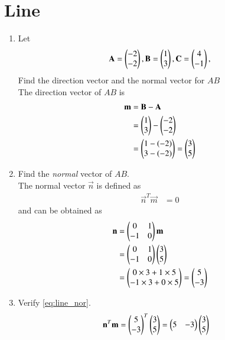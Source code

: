 \documentclass[journal,12pt,twocolumn]{IEEEtran}
\renewcommand\thesection{\arabic{section}}
\begin{document}
\section{Line}
\begin{enumerate}[label=\thesection.\arabic*
,ref=\thesection.\theenumi]
%
\item
\label{prob:draw_triangle}
Let
\begin{equation}
\mathbf{A} =
\begin{pmatrix}-2\\-2\end{pmatrix},
\mathbf{B} =
\begin{pmatrix}1\\3\end{pmatrix},
\mathbf{C} =
\begin{pmatrix}4\\-1\end{pmatrix},
\end{equation}
%
Find the direction vector and the normal vector for $AB$
\\
\solution 
The direction vector of $AB$ is 
\begin{align}
\label{eq:dir_vec}
\mathbf{m} &= \mathbf{B}-\mathbf{A} 
\\
&=  
\begin{pmatrix}1 \\ 3\end{pmatrix} - \begin{pmatrix}-2\\-2\end{pmatrix}
\\
&= \begin{pmatrix}1-(-2)\\3-(-2)\end{pmatrix}=\begin{pmatrix}3\\5\end{pmatrix}
\end{align}
%
\item Find the {\em normal} vector of $AB$.
\\
\solution The normal vector $\vec{n}$ is defined as
\begin{align}
\label{eq:line_nor}
\vec{n}^T\vec{m} &= 0
\end{align}
and can be obtained as
\begin{align}
\mathbf{n}&= \begin{pmatrix}0 & 1 \\ -1 & 0\end{pmatrix}\mathbf{m} 
\\
&=\begin{pmatrix}0 & 1 \\ -1 & 0\end{pmatrix}\begin{pmatrix}3\\5\end{pmatrix}
\\
&= \begin{pmatrix}0\times 3 + 1 \times 5  \\ -1\times 3 + 0 \times 5\end{pmatrix}=\begin{pmatrix}5\\-3\end{pmatrix}
\end{align}
\item Verify \eqref{eq:line_nor}.
\\
\solution 
\begin{align}
\vec{n}^T\vec{m} &= \myvec{5\\-3}^T\myvec{3\\5} = \myvec{5 & -3}\myvec{3\\5}

\end{align}
\end{enumerate}
\end{document}
